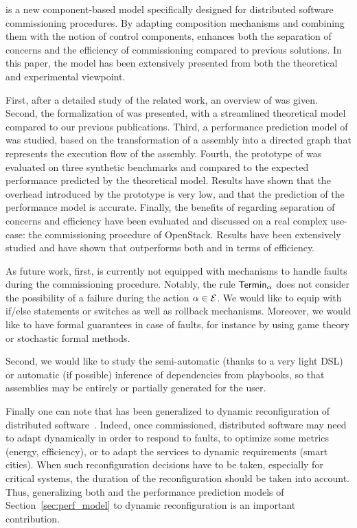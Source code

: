 \mad is a new component-based model specifically designed for distributed software commissioning procedures. By adapting composition mechanisms and combining them with the notion of control components, \mad enhances both the separation of concerns and the efficiency of commissioning compared to previous solutions. In this paper, the \mad model has been extensively presented from both the theoretical and experimental viewpoint.

First, after a detailed study of the related work, an overview of \mad
was given. Second, the formalization of \mad was presented, with a
streamlined theoretical model compared to our previous
publications. Third, a performance prediction model of \mad was
studied, based on the transformation of a \mad assembly into a
directed graph that represents the execution flow of the
assembly. Fourth, the prototype of \mad was evaluated on three
synthetic benchmarks and compared to the expected performance
predicted by the theoretical model. Results have shown that the
overhead introduced by the prototype is very low, and that the prediction
of the performance model is accurate. Finally, the benefits of \mad regarding
separation of concerns and efficiency have been evaluated and
discussed on a real complex use-case: the commissioning procedure of
OpenStack. Results have been extensively studied and have shown that
\mad outperforms both \ansible and \aeolus in terms of efficiency.

As future work, first, \mad is currently not equipped with mechanisms to handle faults during the commissioning procedure. Notably, the rule $\mathsf{Termin}_\alpha$
does not consider the possibility of a failure during the action
$\alpha \in \mathcal{E}$. We would like to equip \mad with if/else statements or switches as well as rollback mechanisms. Moreover, we would like to have formal guarantees in case of faults, for instance by using game theory or stochastic formal methods.

Second, we would like to study the semi-automatic (thanks to a very light DSL) or automatic (if possible) inference of dependencies from \ansible playbooks, so that \mad assemblies may be entirely or partially generated for the user.

Finally one can note that \mad has been generalized to dynamic reconfiguration of distributed software~\cite{ccgridmaverick}. Indeed, once commissioned, distributed software may need to adapt dynamically in order to respond to faults, to optimize some metrics (\eg energy, efficiency), or to adapt the services to dynamic requirements (\eg smart cities). When such reconfiguration decisions have to be taken, especially for critical systems, the duration of the reconfiguration should be taken into account. Thus, generalizing both \mad and the performance prediction models of Section~\ref{sec:perf_model} to dynamic reconfiguration is an important contribution.

  

